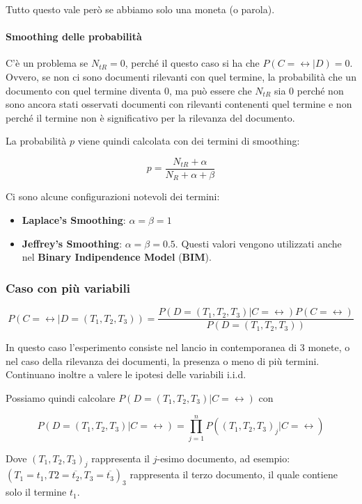 Tutto questo vale però se abbiamo solo una moneta (o parola).

\paragraph{Smoothing delle probabilità} C'è un problema se $N_{tR} = 0$, perché il questo caso si ha che $P(C = \rel | D) = 0$. Ovvero, se non ci sono documenti rilevanti con quel termine, la probabilità che un documento con quel termine diventa 0, ma può essere che $N_{tR}$ sia 0 perché non sono ancora stati osservati documenti con rilevanti contenenti quel termine e non perché il termine non è significativo per la rilevanza del documento.

La probabilità $p$ viene quindi calcolata con dei termini di smoothing:

$$
p = \frac{N_{tR} + \alpha}{N_R + \alpha + \beta}
$$

Ci sono alcune configurazioni notevoli dei termini:

\begin{itemize}
	\item \textbf{Laplace's Smoothing}: $\alpha = \beta = 1$
	\item \textbf{Jeffrey's Smoothing}: $\alpha = \beta = 0.5$. Questi valori vengono utilizzati anche nel \textbf{Binary Indipendence Model} (\textbf{BIM}).
\end{itemize}


\subsubsection{Caso con più variabili}

$$
P(C = \rel | D=(T_1, T_2, T_3)) = \frac{P(D=(T_1,T_2, T_3) | C=\rel)P(C=\rel)}{P(D=(T_1, T_2, T_3))}
$$

\noindent In questo caso l'esperimento consiste nel lancio in contemporanea di 3 monete, o nel caso della rilevanza dei documenti, la presenza o meno di più termini.
Continuano inoltre a valere le ipotesi delle variabili i.i.d.

Possiamo quindi calcolare $P(D=(T_1,T_2, T_3) | C=\rel)$ con

$$
P(D=(T_1,T_2, T_3) | C=\rel) = \prod\limits_{j=1}^{n} P((T_1, T_2,T_3)_j | C = \rel)
$$

Dove $(T_1, T_2,T_3)_j$ rappresenta il $j$-esimo documento, ad esempio: $(T_1 = t_1, T2 = \overline{t_2},T_3 = \overline{t_3})_3$ rappresenta il terzo documento, il quale contiene solo il termine $t_1$.

